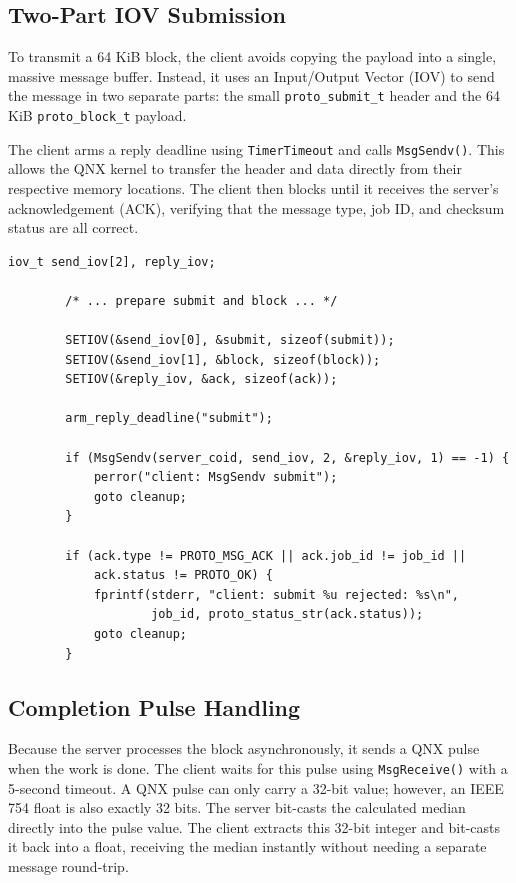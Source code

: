 \documentclass[12pt,a4paper,oneside]{report}
\begin{document}
\subsection{Two-Part IOV Submission}
To transmit a 64 KiB block, the client avoids copying the payload into a single, massive message buffer. Instead, it uses an Input/Output Vector (IOV) to send the message in two separate parts: the small \texttt{proto\_submit\_t} header and the 64 KiB \texttt{proto\_block\_t} payload. 

The client arms a reply deadline using \texttt{TimerTimeout} and calls \texttt{MsgSendv()}. This allows the QNX kernel to transfer the header and data directly from their respective memory locations. The client then blocks until it receives the server's acknowledgement (ACK), verifying that the message type, job ID, and checksum status are all correct.

\begin{lstlisting}[caption={Submitting a block using a two-part IOV}, label={lst:client-iov}]
        iov_t send_iov[2], reply_iov;
        
        /* ... prepare submit and block ... */
        
        SETIOV(&send_iov[0], &submit, sizeof(submit));
        SETIOV(&send_iov[1], &block, sizeof(block));
        SETIOV(&reply_iov, &ack, sizeof(ack));
        
        arm_reply_deadline("submit");
        
        if (MsgSendv(server_coid, send_iov, 2, &reply_iov, 1) == -1) {
            perror("client: MsgSendv submit");
            goto cleanup;
        }
        
        if (ack.type != PROTO_MSG_ACK || ack.job_id != job_id ||
            ack.status != PROTO_OK) {
            fprintf(stderr, "client: submit %u rejected: %s\n",
                    job_id, proto_status_str(ack.status));
            goto cleanup;
        }
\end{lstlisting}

\subsection{Completion Pulse Handling}
Because the server processes the block asynchronously, it sends a QNX pulse when the work is done. The client waits for this pulse using \texttt{MsgReceive()} with a 5-second timeout. A QNX pulse can only carry a 32-bit value; however, an IEEE 754 float is also exactly 32 bits. The server bit-casts the calculated median directly into the pulse value. The client extracts this 32-bit integer and bit-casts it back into a float, receiving the median instantly without needing a separate message round-trip.
\end{document}
